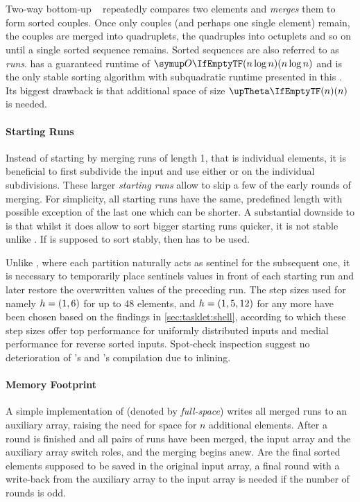 \section{\texorpdfstring{\MS{}}{MergeSort}}
\label{sec:tasklet:merge}

Two-way bottom-up \MS{}~\cites{katajainen1997meticulous}[85\psq]{maurer1974datenstrukturen}[Chapter~2.3.1]{wirth1975algorithmen} repeatedly compares two elements and \emph{merges} them to form sorted couples.
Once only couples (and perhaps one single element) remain, the couples are merged into quadruplets, the quadruples into octuplets and so on until a single sorted sequence remains.
Sorted sequences are also referred to as \emph{runs}.
\MS{} has a guaranteed runtime of \(\bigoh{n \log n}\) and is the only stable sorting algorithm with subquadratic runtime presented in this .
Its biggest drawback is that additional space of size \(\bigtheta{n}\) is needed.


\paragraph{Starting Runs}
Instead of starting by merging runs of length 1, that is individual elements, it is beneficial to first subdivide the input and use either \IS{} or \ShS{} on the individual subdivisions.
These larger \emph{starting runs} allow to skip a few of the early rounds of merging.
For simplicity, all starting runs have the same, predefined length with possible exception of the last one which can be shorter.
A substantial downside to \ShS{} is that whilst it does allow to sort bigger starting runs quicker, it is not stable unlike \IS{}.
If \MS{} is supposed to sort stably, then \IS{} has to be used.

Unlike \QS{}, where each partition naturally acts as sentinel for the subsequent one, it is necessary to temporarily place sentinels values in front of each starting run and later restore the overwritten values of the preceding run.
The step sizes used for \ShS{} \Dash namely \(h = (1, 6)\) for up to 48 elements, and \(h = (1, 5, 12)\) for any more \Dash have been chosen based on the findings in \cref{sec:tasklet:shell}, according to which these step sizes offer top performance for uniformly distributed inputs and medial performance for reverse sorted inputs.
Spot-check inspection suggest no deterioration of \IS{}'s and \ShS{}'s compilation due to inlining.


\paragraph{Memory Footprint}
A simple implementation of \MS{} (denoted by \emph{full-space}) writes all merged runs to an auxiliary array, raising the need for space for \(n\) additional elements.
After a round is finished and all pairs of runs have been merged, the input array and the auxiliary array switch roles, and the merging begins anew.
Are the final sorted elements supposed to be saved in the original input array, a final round with a write-back from the auxiliary array to the input array is needed if the number of rounds is odd.

